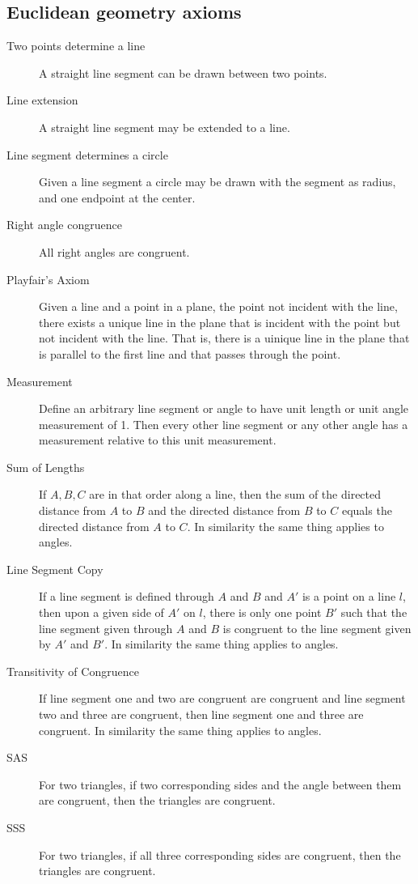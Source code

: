 \documentclass[12pt]{amsart}
\theoremstyle{remark}
\newtheorem*{basic notion}{Basic Notion}
\theoremstyle{mycomment}
\begin{document}
\subsection{Euclidean geometry axioms}
\begin{description}
\item[Two points determine a line] A straight line segment can be drawn between two points.
\item[Line extension] A straight line segment may be extended to a line.
\item[Line segment determines a circle] Given a line segment a circle may be drawn with the segment as radius, and one endpoint at the center.
\item[Right angle congruence] All right angles are congruent.
\item[Playfair's Axiom] Given a line and a point in a plane, the point not incident with the line, there exists a unique line in the plane that is incident with the point but not incident with the line. That is, there is a uinique line in the plane that is parallel to the first line and that passes through the point.
\item[Measurement] Define an arbitrary line segment or angle to have unit length or unit angle measurement of 1. Then every other line segment or any other angle has a measurement relative to this unit measurement.
\item[Sum of Lengths] If $A, B, C$ are in that order along a line, then the sum of the directed distance from $A$ to $B$ and the directed distance from $B$ to $C$ equals the directed distance from  $A$ to $C$. In similarity the same thing applies to angles.
\item[Line Segment Copy] If  a line segment is defined through $A$ and $B$ and $A'$ is a point on a line $l$, then upon a given side of $A'$ on $l$, there is only one point $B'$ such that the line segment given through $A$ and $B$ is congruent to the line segment given by $A'$ and $B'$. In similarity the same thing applies to angles.
\item[Transitivity of Congruence] If line segment one and two are congruent are congruent and line segment two and three are congruent, then line segment one and three are congruent. In similarity the same thing applies to angles.
\item[SAS] For two triangles, if two corresponding sides and the angle between them are congruent, then the triangles are congruent. 
\item[SSS] For two triangles, if all three corresponding sides are congruent, then the triangles are congruent.
\end{description}
\end{document}
